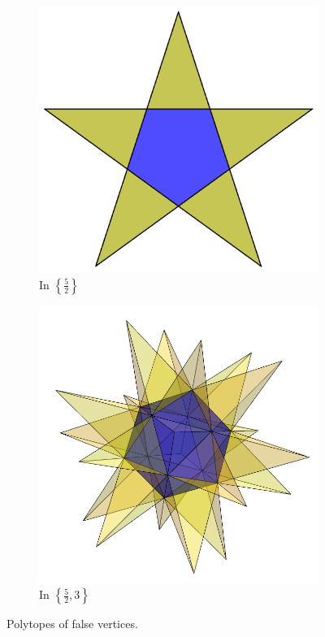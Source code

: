 \documentclass{article}
\theoremstyle{definition}
\begin{document}
	\begin{figure}[h]
		\begin{center}
			\begin{subfigure}[t]{0.4\linewidth}
		\centering
		\includegraphics[width=\linewidth]{fig1a}
		\caption{In $\left\{\frac{5}{2}\right\}$}
		\end{subfigure}
		\begin{subfigure}[t]{0.4\linewidth}
			\centering
			\includegraphics[width=\linewidth]{fig1b}
			\caption{In $\left\{\frac{5}{2},3\right\}$}
		\end{subfigure}
		\end{center}
		\caption{Polytopes of false vertices.}\label{fig:1}
	\end{figure}
	
\end{document}
